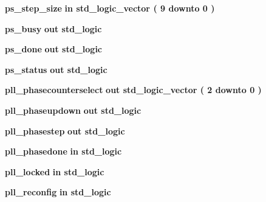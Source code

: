\begin{DoxyCompactItemize}
{\bf ps\+\_\+step\+\_\+size}  {\bfseries {\bfseries \textcolor{keywordflow}{in}\textcolor{vhdlchar}{ }}} {\bfseries \textcolor{comment}{std\+\_\+logic\+\_\+vector}\textcolor{vhdlchar}{ }\textcolor{vhdlchar}{(}\textcolor{vhdlchar}{ }\textcolor{vhdlchar}{ } \textcolor{vhdldigit}{9} \textcolor{vhdlchar}{ }\textcolor{keywordflow}{downto}\textcolor{vhdlchar}{ }\textcolor{vhdlchar}{ } \textcolor{vhdldigit}{0} \textcolor{vhdlchar}{ }\textcolor{vhdlchar}{)}\textcolor{vhdlchar}{ }} 
\item 
{\bf ps\+\_\+busy}  {\bfseries {\bfseries \textcolor{keywordflow}{out}\textcolor{vhdlchar}{ }}} {\bfseries \textcolor{comment}{std\+\_\+logic}\textcolor{vhdlchar}{ }} 
\item 
{\bf ps\+\_\+done}  {\bfseries {\bfseries \textcolor{keywordflow}{out}\textcolor{vhdlchar}{ }}} {\bfseries \textcolor{comment}{std\+\_\+logic}\textcolor{vhdlchar}{ }} 
\item 
{\bf ps\+\_\+status}  {\bfseries {\bfseries \textcolor{keywordflow}{out}\textcolor{vhdlchar}{ }}} {\bfseries \textcolor{comment}{std\+\_\+logic}\textcolor{vhdlchar}{ }} 
\item 
{\bf pll\+\_\+phasecounterselect}  {\bfseries {\bfseries \textcolor{keywordflow}{out}\textcolor{vhdlchar}{ }}} {\bfseries \textcolor{comment}{std\+\_\+logic\+\_\+vector}\textcolor{vhdlchar}{ }\textcolor{vhdlchar}{(}\textcolor{vhdlchar}{ }\textcolor{vhdlchar}{ } \textcolor{vhdldigit}{2} \textcolor{vhdlchar}{ }\textcolor{keywordflow}{downto}\textcolor{vhdlchar}{ }\textcolor{vhdlchar}{ } \textcolor{vhdldigit}{0} \textcolor{vhdlchar}{ }\textcolor{vhdlchar}{)}\textcolor{vhdlchar}{ }} 
\item 
{\bf pll\+\_\+phaseupdown}  {\bfseries {\bfseries \textcolor{keywordflow}{out}\textcolor{vhdlchar}{ }}} {\bfseries \textcolor{comment}{std\+\_\+logic}\textcolor{vhdlchar}{ }} 
\item 
{\bf pll\+\_\+phasestep}  {\bfseries {\bfseries \textcolor{keywordflow}{out}\textcolor{vhdlchar}{ }}} {\bfseries \textcolor{comment}{std\+\_\+logic}\textcolor{vhdlchar}{ }} 
\item 
{\bf pll\+\_\+phasedone}  {\bfseries {\bfseries \textcolor{keywordflow}{in}\textcolor{vhdlchar}{ }}} {\bfseries \textcolor{comment}{std\+\_\+logic}\textcolor{vhdlchar}{ }} 
\item 
{\bf pll\+\_\+locked}  {\bfseries {\bfseries \textcolor{keywordflow}{in}\textcolor{vhdlchar}{ }}} {\bfseries \textcolor{comment}{std\+\_\+logic}\textcolor{vhdlchar}{ }} 
\item 
{\bf pll\+\_\+reconfig}  {\bfseries {\bfseries \textcolor{keywordflow}{in}\textcolor{vhdlchar}{ }}} {\bfseries \textcolor{comment}{std\+\_\+logic}\textcolor{vhdlchar}{ }} 

\end{DoxyCompactItemize}

